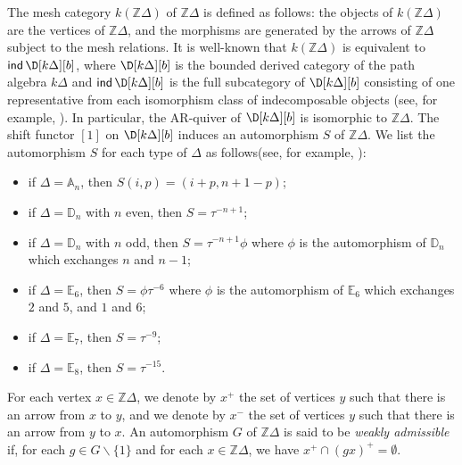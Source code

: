 \documentclass[12pt]{article}
\theoremstyle{plain}
\theoremstyle{definition}
\DeclareMathOperator{\ind}{\sf ind}
\newcommand{\Db}[1][]{\D[#1][b]}
\begin{document}
The mesh category $k(\mathbb{Z}\Delta)$ of $\mathbb{Z}\Delta$ is defined as follows: the objects of $k(\mathbb{Z}\Delta)$ are the vertices of $\mathbb{Z}\Delta$, and the morphisms are generated by the arrows of $\mathbb{Z}\Delta$ subject to the mesh relations. It is well-known that $k(\mathbb{Z}\Delta)$ is equivalent to $\ind \Db[k\Delta]$, where $\Db[k\Delta]$ is the bounded derived category of the path algebra $k\Delta$ and $\ind\Db[k\Delta]$ is the full subcategory of $\Db[k\Delta]$ consisting of one representative from each isomorphism class of indecomposable objects (see, for example, \cite{Happel1988aa}). In particular, the AR-quiver of $\Db[k\Delta]$ is isomorphic to $\mathbb{Z}\Delta$. The shift functor $[1]$ on $\Db[k\Delta]$ induces an automorphism $S$ of $\mathbb{Z}\Delta$. We list the automorphism $S$ for each type of $\Delta$ as follows(see, for example, \cite[2.2]{Amiot2007}):
\begin{itemize}
	\item[--] if $\Delta = \mathbb{A}_n$, then $S(i, p) = (i + p, n + 1 - p)$; 
	\item[--] if $\Delta = \mathbb{D}_n$ with $n$ even, then $S = \tau^{-n+1}$; 
	\item[--] if $\Delta = \mathbb{D}_n$ with $n$ odd, then $S = \tau^{-n+1}\phi$ where $\phi$ is the automorphism of $\mathbb{D}_n$ which exchanges $n$ and $n - 1$; 
	\item[--] if $\Delta = \mathbb{E}_6$, then $S = \phi\tau^{-6}$ where $\phi$ is the automorphism of $\mathbb{E}_6$ which exchanges $2$ and $5$, and $1$ and $6$; 
	\item[--] if $\Delta = \mathbb{E}_7$, then $S = \tau^{-9}$; 
	\item[--] if $\Delta = \mathbb{E}_8$, then $S = \tau^{-15}$.
\end{itemize}
For each vertex $x\in\mathbb{Z}\Delta$, we denote by $x^+$ the set of vertices $y$ such that there is an arrow from $x$ to $y$, and we denote by $x^-$ the set of vertices $y$ such that there is an arrow from $y$ to $x$.  An automorphism $G$ of $\mathbb{Z}\Delta$ is said to be {\em weakly admissible} \cite{Dieterich1987} if, for each $g \in G \backslash \{1\}$ and for each $x \in \mathbb{Z}\Delta$, we have $x^+ \cap (gx)^+ = \emptyset$.
\end{document}
